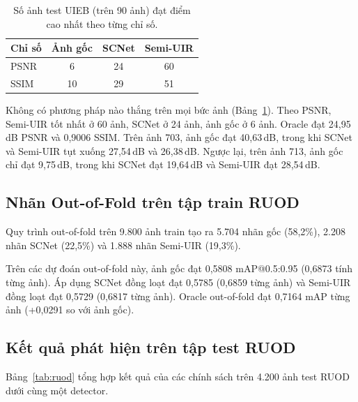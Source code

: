 \documentclass[runningheads]{llncs}
\begin{document}
\begin{table}[t]
    \centering
    \caption{Số ảnh test UIEB (trên 90 ảnh) đạt điểm cao nhất theo từng chỉ số.}
    \label{tab:best}
    \begin{tabular}{l c c c}
        \toprule
        Chỉ số & Ảnh gốc & SCNet & Semi-UIR \\
        \midrule
        PSNR   & 6       & 24    & 60       \\
        SSIM   & 10      & 29    & 51       \\
        \bottomrule
    \end{tabular}
\end{table}

Không có phương pháp nào thắng trên mọi bức ảnh (Bảng~\ref{tab:best}). Theo PSNR, Semi-UIR tốt nhất ở 60 ảnh, SCNet ở 24 ảnh, ảnh gốc ở 6 ảnh. Oracle đạt 24,95\,dB PSNR và 0,9006 SSIM. Trên ảnh 703, ảnh gốc đạt 40,63\,dB, trong khi SCNet và Semi-UIR tụt xuống 27,54\,dB và 26,38\,dB. Ngược lại, trên ảnh 713, ảnh gốc chỉ đạt 9,75\,dB, trong khi SCNet đạt 19,64\,dB và Semi-UIR đạt 28,54\,dB.

\subsection{Nhãn Out-of-Fold trên tập train RUOD}
\label{sec:res-oof}

Quy trình out-of-fold trên 9.800 ảnh train tạo ra 5.704 nhãn gốc (58,2\%), 2.208 nhãn SCNet (22,5\%) và 1.888 nhãn Semi-UIR (19,3\%).

Trên các dự đoán out-of-fold này, ảnh gốc đạt 0,5808 mAP@0.5:0.95 (0,6873 tính từng ảnh). Áp dụng SCNet đồng loạt đạt 0,5785 (0,6859 từng ảnh) và Semi-UIR đồng loạt đạt 0,5729 (0,6817 từng ảnh). Oracle out-of-fold đạt 0,7164 mAP từng ảnh (+0,0291 so với ảnh gốc).

\subsection{Kết quả phát hiện trên tập test RUOD}
\label{sec:res-detection}

Bảng~\ref{tab:ruod} tổng hợp kết quả của các chính sách trên 4.200 ảnh test RUOD dưới cùng một detector.
\end{document}
